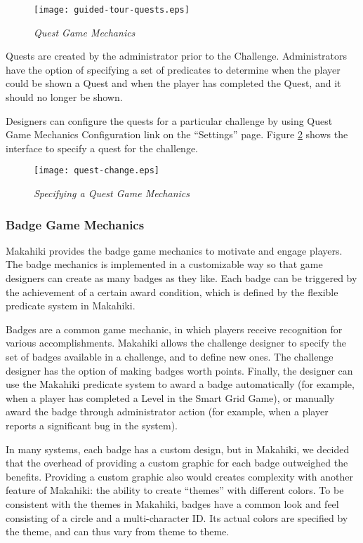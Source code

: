 \begin{figure}[!ht]
  \center
  \texttt{[image: guided-tour-quests.eps]}
  \caption{\em Quest Game Mechanics}
  \label{fig:guided-tour-quests}
\end{figure}

Quests are created by the administrator prior to the Challenge. Administrators have the option of specifying a set of predicates to determine when the player could be shown a Quest and when the player has completed the Quest, and it should no longer be shown.

Designers can configure the quests for a particular challenge by using Quest Game Mechanics Configuration link on the ``Settings'' page. Figure \ref{fig:quest-change} shows the interface to specify a quest for the challenge.

\begin{figure}[!ht]
  \center
  \texttt{[image: quest-change.eps]}
  \caption{\em Specifying a Quest Game Mechanics}
  \label{fig:quest-change}
\end{figure}

\clearpage

\subsubsection{Badge Game Mechanics}

Makahiki provides the badge game mechanics to motivate and engage players. The badge mechanics is implemented in a customizable way so that  game designers can create as many badges as they like. Each badge can be triggered by the achievement of a certain award condition, which is defined by the flexible predicate system in Makahiki. 

Badges are a common game mechanic, in which players receive recognition for various accomplishments. Makahiki allows the challenge designer to specify the set of badges available in a challenge, and to define new ones. The challenge designer has the option of making badges worth points. Finally, the designer can use the Makahiki predicate system to award a badge automatically (for example, when a player has completed a Level in the Smart Grid Game), or manually award the badge through administrator action (for example, when a player reports a significant bug in the system).

In many systems, each badge has a custom design, but in Makahiki, we decided that the overhead of providing a custom graphic for each badge outweighed the benefits. Providing a custom graphic also would creates complexity with another feature of Makahiki: the ability to create ``themes'' with different colors. To be consistent with the themes in Makahiki, badges have a common look and feel consisting of a circle and a multi-character ID. Its actual colors are specified by the theme, and can thus vary from theme to theme.


